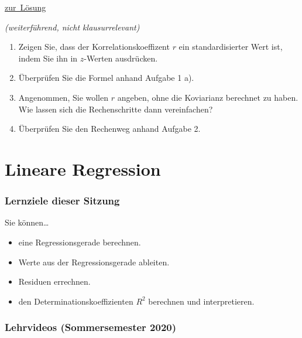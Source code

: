 \documentclass[
  11pt,
  ngerman,
  a4paper,
]{report}
\providecommand{\tightlist}{%
  \setlength{\itemsep}{0pt}\setlength{\parskip}{0pt}}
\begin{document}
\protect\hyperlink{loesung-7-5}{zur~Lösung}

\emph{(weiterführend, nicht klausurrelevant)}

\begin{enumerate}
\def\labelenumi{\alph{enumi})}
\tightlist
\item
  Zeigen Sie, dass der Korrelationskoeffizent \(r\) ein standardisierter Wert ist, indem Sie ihn in \(z\)-Werten ausdrücken.
\item
  Überprüfen Sie die Formel anhand Aufgabe 1 a).
\item
  Angenommen, Sie wollen \(r\) angeben, ohne die Koviarianz berechnet zu haben. Wie lassen sich die Rechenschritte dann vereinfachen?
\item
  Überprüfen Sie den Rechenweg anhand Aufgabe 2.
\end{enumerate}

\hypertarget{lineare-regression}{%
\chapter{Lineare Regression}\label{lineare-regression}}

\hypertarget{lernziele-dieser-sitzung-7}{%
\subsection*{Lernziele dieser Sitzung}\label{lernziele-dieser-sitzung-7}}

Sie können\ldots{}

\begin{itemize}
\tightlist
\item
  eine Regressionsgerade berechnen.
\item
  Werte aus der Regressionsgerade ableiten.
\item
  Residuen errechnen.
\item
  den Determinationskoeffizienten \(R^2\) berechnen und interpretieren.
\end{itemize}

\hypertarget{lehrvideos-sommersemester-2020-4}{%
\subsection*{Lehrvideos (Sommersemester 2020)}\label{lehrvideos-sommersemester-2020-4}}
\end{document}
